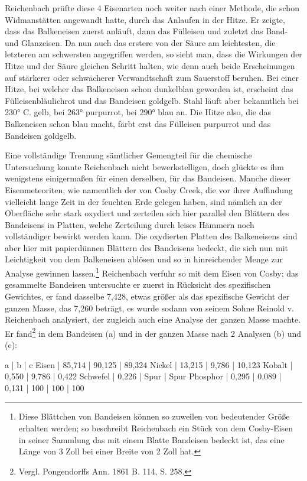 \documentclass[a4paper, 11pt, oneside]{article}
\begin{document}
Reichenbach prüfte diese 4 Eisenarten noch weiter nach einer Methode, die schon Widmanstätten angewandt hatte, durch das Anlaufen in der Hitze. Er zeigte, dass das Balkeneisen zuerst anläuft, dann das Fülleisen und zuletzt das Band- und Glanzeisen. Da nun auch das erstere von der Säure am leichtesten, die letzteren am schwersten angegriffen werden, so sieht man, dass die Wirkungen der Hitze und der Säure gleichen Schritt halten, wie denn auch beide Erscheinungen auf stärkerer oder schwächerer Verwandtschaft zum Sauerstoff beruhen. Bei einer Hitze, bei welcher das Balkeneisen schon dunkelblau geworden ist, erscheint das Fülleisenbläulichrot und das Bandeisen goldgelb. Stahl läuft aber bekanntlich bei 230° C. gelb, bei 263° purpurrot, bei 290° blau an. Die Hitze also, die das Balkeneisen schon blau macht, färbt erst das Fülleisen purpurrot und das Bandeisen goldgelb.

Eine vollständige Trennung sämtlicher Gemengteil für die chemische Untersuchung konnte Reichenbach nicht bewerkstelligen, doch glückte es ihm wenigstens einigermaßen für einen derselben, für das Bandeisen. Manche dieser Eisenmeteoriten, wie namentlich der von Cosby Creek, die vor ihrer Auffindung vielleicht lange Zeit in der feuchten Erde gelegen haben, sind nämlich an der Oberfläche sehr stark oxydiert und zerteilen sich hier parallel den Blättern des Bandeisens in Platten, welche Zerteilung durch leises Hämmern noch vollständiger bewirkt werden kann. Die oxydierten Platten des Balkeneisens sind aber hier mit papierdünnen Blättern des Bandeisens bedeckt, die sich nun mit Leichtigkeit von dem Balkeneisen ablösen und so in hinreichender Menge zur Analyse gewinnen lassen.\footnote{Diese Blättchen von Bandeisen können so zuweilen von bedeutender Größe erhalten werden; so beschreibt Reichenbach ein Stück von dem Cosby-Eisen in seiner Sammlung das mit einem Blatte Bandeisen bedeckt ist, das eine Länge von 3 Zoll bei einer Breite von 2 Zoll hat.} Reichenbach verfuhr so mit dem Eisen von Cosby; das gesammelte Bandeisen untersuchte er zuerst in Rücksicht des spezifischen Gewichtes, er fand dasselbe 7,428, etwas größer als das spezifische Gewicht der ganzen Masse, das 7,260 beträgt, es wurde sodann von seinem Sohne Reinold v. Reichenbach analysiert, der zugleich auch eine Analyse der ganzen Masse machte. Er fand\footnote{Vergl. Pongendorffs Ann. 1861 B. 114, S. 258.} in dem Bandeisen (a) und in der ganzen Masse nach 2 Analysen (b) und (c):

a | b | c  
Eisen | 85,714 | 90,125 | 89,324  
Nickel | 13,215 | 9,786 | 10,123  
Kobalt | 0,550 | 9,786 | 0,422  
Schwefel | 0,226 | Spur | Spur  
Phosphor | 0,295 | 0,089 | 0,131  
 | 100 | 100 | 100  
\end{document}
